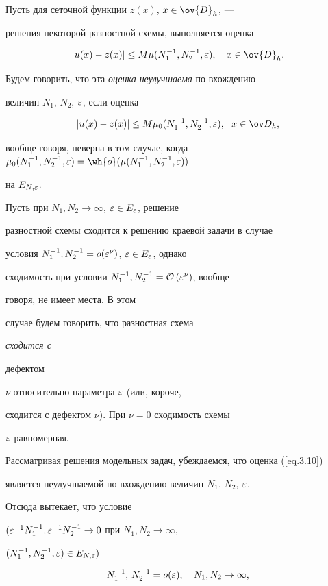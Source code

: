 Пусть для сеточной функции $z(x)$, $x\in\ov{D}_h$, ---


решения некоторой разностной схемы, выполняется оценка


$$


|u(x)-z(x)|\le M\mu(N_1^{-1},N_2^{-1},\eps), \quad 


x\in\ov{D}_h.


$$


Будем говорить, что эта {\it оценка неулучшаема} по вхождению


величин $N_1$, $N_2$, $\varepsilon$, если оценка


$$


|u(x)-z(x)|\le M \mu_0 (N_1^{-1}, N_2^{-1},\eps),\ \ x \in \od_h,


$$


вообще говоря, неверна в том случае, когда $\mu_0 (N_1^{-1},


N_2^{-1},\eps) = \wh{o} (\mu(N_1^{-1}, N_2^{-1},\eps))$


на $E_{N,\varepsilon}$.





Пусть при $N_1, N_2\to\infty$, $\varepsilon\in E_{\varepsilon}$, решение


разностной схемы сходится к решению краевой задачи в случае


условия $N_1^{-1},N_2^{-1}=o(\varepsilon^{\nu})$, $\varepsilon\in E_\varepsilon$, однако 


сходимость при условии $N_1^{-1},N_2^{-1}={\cal O} \left(\varepsilon^{\nu}\right)$, вообще 


говоря, не имеет места. В этом


случае будем говорить, что разностная схема {\it сходится с


дефектом} $\nu$ относительно параметра $\varepsilon$ (или, короче,


сходится с дефектом $\nu$). При $\nu=0$ сходимость схемы


$\varepsilon$-равномерная.





Рассматривая решения модельных задач, убеждаемся, что оценка (\ref{eq.3.10})


является неулучшаемой по вхождению величин $N_1$, $N_2$, $\varepsilon$.


Отсюда вытекает, что условие


$(\varepsilon^{-1}N_1^{-1},\varepsilon^{-1}N_2^{-1}\to 0$ при $N_1,N_2\to\infty$,


$(N_1^{-1},N_2^{-1},\varepsilon)\in E_{N,\varepsilon})$


\begin{equation}


\label{eq.3.11}


N_1^{-1},\, N_2^{-1}=o(\eps), \quad N_1,N_2\to\infty,


\end{equation}


